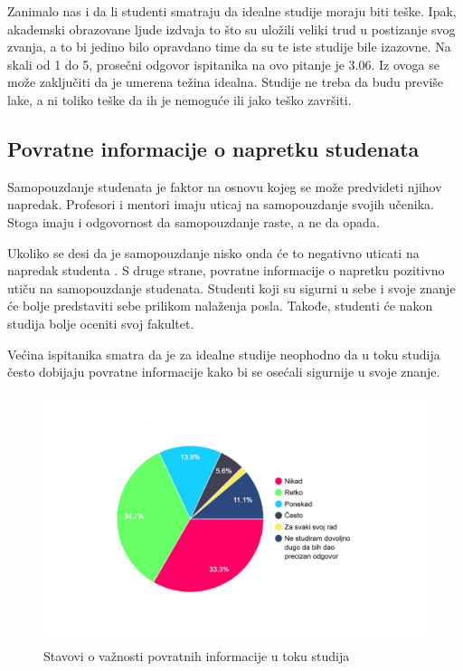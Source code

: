 \documentclass[a4paper]{article}
\begin{document}
{Zanimalo nas i da li studenti smatraju da idealne studije moraju biti teške. Ipak, akademski obrazovane ljude izdvaja to što su uložili veliki trud u postizanje svog zvanja, a to bi jedino bilo opravdano time da su te iste studije bile izazovne. Na skali od 1 do 5, prosečni odgovor ispitanika na ovo pitanje je 3.06. Iz ovoga se može zaključiti da je umerena težina idealna. Studije ne treba da budu previše lake, a ni toliko teške da ih je nemoguće ili jako teško završiti.

\subsection{Povratne informacije o napretku studenata}
\label{subsec:povrane_informacije}

Samopouzdanje studenata je faktor na osnovu kojeg se može predvideti njihov napredak\cite{correlation}.
Profesori i mentori imaju uticaj na samopouzdanje svojih učenika. Stoga imaju i odgovornost da samopouzdanje raste, a ne da opada.

Ukoliko se desi da je samopouzdanje nisko onda će to negativno uticati na napredak studenta \cite{confidence}. S druge strane, povratne informacije o napretku pozitivno utiču na samopouzdanje studenata. Studenti koji su sigurni u sebe i svoje znanje će bolje predstaviti sebe prilikom nalaženja posla. Takođe, studenti će nakon studija bolje oceniti svoj fakultet. 

Većina ispitanika smatra da je za idealne studije neophodno da u toku studija često dobijaju povratne informacije kako bi se osećali sigurnije u svoje znanje. 
\begin{figure}[h!]
\begin{center}
    \includegraphics[width=0.7\linewidth]{Slike/PieChartPovratneInformacije.png}
    \caption{Stavovi o važnosti povratnih informacije u toku studija}
    \label{fig:povratne_informacije}
\end{center}
\end{figure}

}
\end{document}
